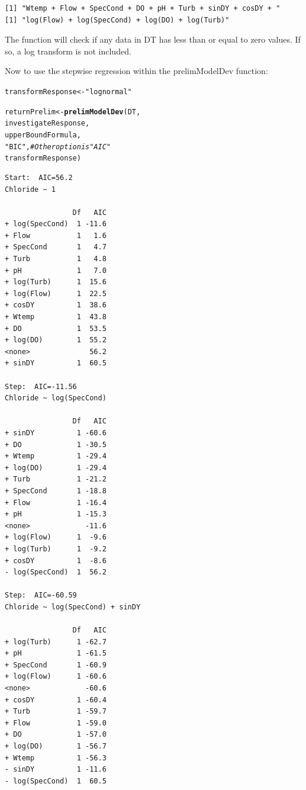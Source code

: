 \documentclass[a4paper,11pt]{article}\usepackage[]{graphicx}\usepackage[]{color}
\makeatletter
\newcommand{\hlstr}[1]{\textcolor[rgb]{0.192,0.494,0.8}{#1}}%
\newcommand{\hlcom}[1]{\textcolor[rgb]{0.678,0.584,0.686}{\textit{#1}}}%
\newcommand{\hlstd}[1]{\textcolor[rgb]{0.345,0.345,0.345}{#1}}%
\newcommand{\hlkwb}[1]{\textcolor[rgb]{0.69,0.353,0.396}{#1}}%
\newcommand{\hlkwd}[1]{\textcolor[rgb]{0.737,0.353,0.396}{\textbf{#1}}}%
\newenvironment{kframe}{%
 \def\at@end@of@kframe{}%
 \ifinner\ifhmode%
  \def\at@end@of@kframe{\end{minipage}}%
  \begin{minipage}{\columnwidth}%
 \fi\fi%
 \def\FrameCommand##1{\hskip\@totalleftmargin \hskip-\fboxsep
 \colorbox{shadecolor}{##1}\hskip-\fboxsep
     \hskip-\linewidth \hskip-\@totalleftmargin \hskip\columnwidth}%
 \MakeFramed {\advance\hsize-\width
   \@totalleftmargin\z@ \linewidth\hsize
   \@setminipage}}%
 {\par\unskip\endMakeFramed%
 \at@end@of@kframe}
\newenvironment{knitrout}{}{} %
\makeatother
\begin{document}
\begin{knitrout}
\color{fgcolor}\begin{kframe}
\begin{verbatim}
[1] "Wtemp + Flow + SpecCond + DO + pH + Turb + sinDY + cosDY + "
[1] "log(Flow) + log(SpecCond) + log(DO) + log(Turb)"
\end{verbatim}
\end{kframe}
\end{knitrout}


The function will check if any data in DT has less than or equal to zero values. If so, a log transform is not included.

Now to use the stepwise regression within the prelimModelDev function:

\begin{knitrout}
\color{fgcolor}\begin{kframe}
\begin{alltt}
\hlstd{transformResponse} \hlkwb{<-} \hlstr{"lognormal"}

\hlstd{returnPrelim} \hlkwb{<-} \hlkwd{prelimModelDev}\hlstd{(DT,}
                 \hlstd{investigateResponse,}
                 \hlstd{upperBoundFormula,}
                 \hlstr{"BIC"}\hlstd{,} \hlcom{#Other option is "AIC"}
                 \hlstd{transformResponse)}
\end{alltt}
\begin{verbatim}
Start:  AIC=56.2
Chloride ~ 1

                Df   AIC
+ log(SpecCond)  1 -11.6
+ Flow           1   1.6
+ SpecCond       1   4.7
+ Turb           1   4.8
+ pH             1   7.0
+ log(Turb)      1  15.6
+ log(Flow)      1  22.5
+ cosDY          1  38.6
+ Wtemp          1  43.8
+ DO             1  53.5
+ log(DO)        1  55.2
<none>              56.2
+ sinDY          1  60.5

Step:  AIC=-11.56
Chloride ~ log(SpecCond)

                Df   AIC
+ sinDY          1 -60.6
+ DO             1 -30.5
+ Wtemp          1 -29.4
+ log(DO)        1 -29.4
+ Turb           1 -21.2
+ SpecCond       1 -18.8
+ Flow           1 -16.4
+ pH             1 -15.3
<none>             -11.6
+ log(Flow)      1  -9.6
+ log(Turb)      1  -9.2
+ cosDY          1  -8.6
- log(SpecCond)  1  56.2

Step:  AIC=-60.59
Chloride ~ log(SpecCond) + sinDY

                Df   AIC
+ log(Turb)      1 -62.7
+ pH             1 -61.5
+ SpecCond       1 -60.9
+ log(Flow)      1 -60.6
<none>             -60.6
+ cosDY          1 -60.4
+ Turb           1 -59.7
+ Flow           1 -59.0
+ DO             1 -57.0
+ log(DO)        1 -56.7
+ Wtemp          1 -56.3
- sinDY          1 -11.6
- log(SpecCond)  1  60.5


\end{verbatim}
\end{kframe}
\end{knitrout}
\end{document}
